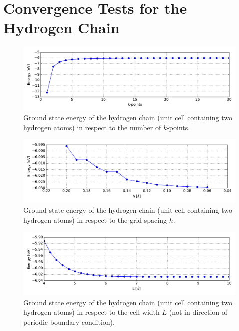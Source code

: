 \section{Convergence Tests for the Hydrogen Chain}
\label{section_conv_hyd}
\begin{figure}[!h]
	\centering
	\includegraphics[width = 13cm]{Images/Hydrogen/convergence/kpts-energy}
	\caption{Ground state energy of the hydrogen chain (unit cell containing two hydrogen atoms) in respect to the number of $k$-points.}
	\label{}
\end{figure}
\begin{figure}[!h]
	\centering
	\includegraphics[width = 13cm]{Images/Hydrogen/convergence/gridspacing-energy}
	\caption{Ground state energy of the hydrogen chain (unit cell containing two hydrogen atoms) in respect to the grid spacing $h$.}
	\label{}
\end{figure}
\begin{figure}[!h]
	\centering
	\includegraphics[width = 13cm]{Images/Hydrogen/convergence/unit_cell_width}
	\caption{Ground state energy of the hydrogen chain (unit cell containing two hydrogen atoms) in respect to the cell width $L$ (not in direction of periodic boundary condition).}
	\label{}
\end{figure}

